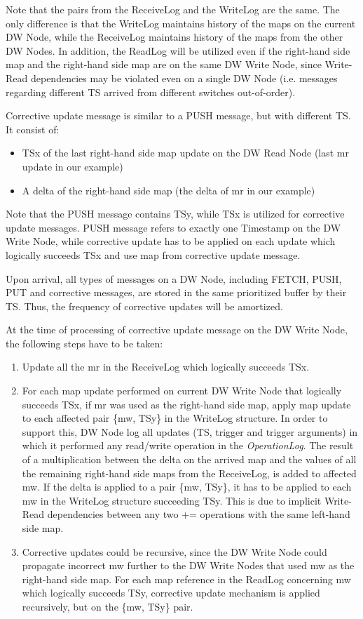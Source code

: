 \documentclass{sig-semester}
\begin{document}
Note that the pairs from the ReceiveLog and the WriteLog are the same. The only difference is that the WriteLog maintains history of the maps on the current DW Node, while the ReceiveLog maintains history of the maps from the other DW Nodes. In addition, the ReadLog will be utilized even if the right-hand side map and the right-hand side map are on the same DW Write Node, since Write-Read dependencies may be violated even on a single DW Node (i.e. messages regarding different TS arrived from different switches out-of-order).

Corrective update message is similar to a PUSH message, but with different TS. It consist of:
\begin{itemize}
 \item TSx of the last right-hand side map update on the DW Read Node (last mr update in our example)
 \item A delta of the right-hand side map (the delta of mr in our example)
\end{itemize}

Note that the PUSH message contains TSy, while TSx is utilized for corrective update messages. PUSH message refers to exactly one Timestamp on the DW Write Node, while corrective update has to be applied on each update which logically succeeds TSx and use map from corrective update message.

Upon arrival, all types of messages on a DW Node, including FETCH, PUSH, PUT and corrective messages, are stored in the same prioritized buffer by their TS. Thus, the frequency of corrective updates will be amortized.

At the time of processing of corrective update message on the DW Write Node, the following steps have to be taken:
\begin{enumerate}[(1)]
 \item Update all the mr in the ReceiveLog which logically succeeds TSx.

 \item For each map update performed on current DW Write Node that logically succeeds TSx, if mr was used as the right-hand side map, apply map update to each affected pair \{mw, TSy\} in the WriteLog structure. In order to support this, DW Node log all updates (TS, trigger and trigger arguments) in which it performed any read/write operation in the \textit{OperationLog}. The result of a multiplication between the delta on the arrived map and the values of all the remaining right-hand side maps from the ReceiveLog, is added to affected mw. If the delta is applied to a pair \{mw, TSy\}, it has to be applied to each mw in the WriteLog structure succeeding TSy. This is due to implicit Write-Read dependencies between any two += operations with the same left-hand side map.

 \item Corrective updates could be recursive, since the DW Write Node could propagate incorrect mw further to the DW Write Nodes that used mw as the right-hand side map. For each map reference in the ReadLog concerning mw which logically succeeds TSy, corrective update mechanism is applied recursively, but on the \{mw, TSy\} pair.
\end{enumerate}
\end{document}

